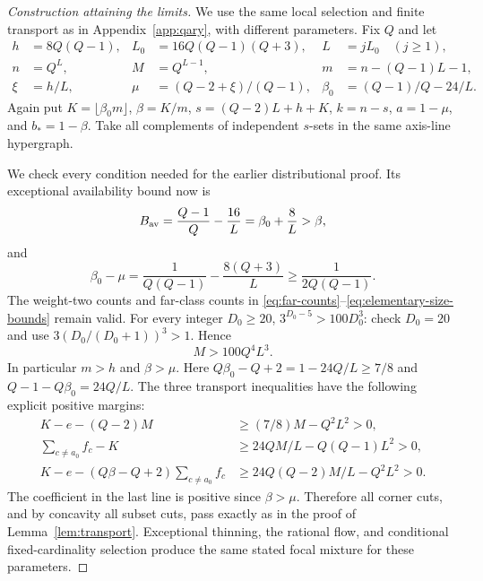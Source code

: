 \begin{proof}[Construction attaining the limits]
We use the same local selection and finite transport as in
Appendix~\ref{app:qary}, with different parameters.  Fix $Q$ and let
\begin{align*}
 h&=8Q(Q-1),& L_0&=16Q(Q-1)(Q+3),& L&=jL_0\quad(j\ge1),\\
 n&=Q^L,& M&=Q^{L-1},&m&=n-(Q-1)L-1,\\
 \xi&=h/L,&\mu&=(Q-2+\xi)/(Q-1),&
 \beta_0&=(Q-1)/Q-24/L.
\end{align*}
Again put $K=\lfloor\beta_0m\rfloor$, $\beta=K/m$,
$s=(Q-2)L+h+K$, $k=n-s$, $a=1-\mu$, and $b_*=1-\beta$.
Take all complements of independent $s$-sets in the same axis-line
hypergraph.

We check every condition needed for the earlier distributional proof.
Its exceptional availability bound now is
\[
 B_{\rm av}=\frac{Q-1}{Q}-\frac{16}{L}
            =\beta_0+\frac8L>\beta,
\]
and
\[
 \beta_0-\mu=\frac1{Q(Q-1)}-\frac{8(Q+3)}L
             \ge\frac1{2Q(Q-1)}.
\]
The weight-two counts and far-class counts in
\eqref{eq:far-counts}--\eqref{eq:elementary-size-bounds} remain valid.
For every integer $D_0\ge20$, $3^{D_0-5}>100D_0^3$: check $D_0=20$
and use $3(D_0/(D_0+1))^3>1$.  Hence
\[
 M>100Q^4L^3.
\]
In particular $m>h$ and $\beta>\mu$.
Here $Q\beta_0-Q+2=1-24Q/L\ge7/8$ and
$Q-1-Q\beta_0=24Q/L$.  The three transport inequalities have the
following explicit positive margins:
\begin{align*}
 K-e-(Q-2)M&\ge(7/8)M-Q^2L^2>0,\\
 \sum_{c\ne a_0} f_c-K&\ge24QM/L-Q(Q-1)L^2>0,\\
 K-e-(Q\beta-Q+2)\sum_{c\ne a_0}f_c
       &\ge24Q(Q-2)M/L-Q^2L^2>0.
\end{align*}
The coefficient in the last line is positive since $\beta>\mu$.
Therefore all corner cuts, and by concavity all subset cuts, pass exactly
as in the proof of Lemma~\ref{lem:transport}.  Exceptional thinning,
the rational flow, and conditional fixed-cardinality selection produce
the same stated focal mixture for these parameters.


\end{proof}

